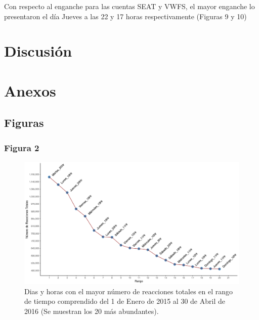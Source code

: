 \documentclass[a4paper,10pt]{article}
\begin{document}
Con respecto al enganche para las cuentas SEAT y VWFS, el
mayor enganche lo presentaron el día Jueves a las 22 y 17 horas
respectivamente (Figuras 9 y 10)






\section{Discusión}

\section{Anexos}
\subsection{Figuras}
\subsubsection{Figura 2}
\begin{figure}[H]
  \begin{center}
   \includegraphics[width=.85\textwidth]{imagenes/figura2.png}
   \captionsetup{width=.80\textwidth}
   \caption{\centering Dias y horas con el mayor número de reacciones totales en el rango de tiempo
   comprendido del 1 de Enero de 2015 al 30 de Abril de 2016 (Se muestran los  20 más abundantes).}
  \end{center} 
\end{figure}
\end{document}
